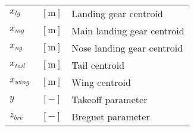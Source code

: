 \documentclass[12pt]{article}
\begin{document}
{\begin{supertabular}{lcl}
$x_{lg}$ & $~\mathrm{[m]}$ & Landing gear centroid\\
$x_{mg}$ & $~\mathrm{[m]}$ & Main landing gear centroid\\
$x_{ng}$ & $~\mathrm{[m]}$ & Nose landing gear centroid\\
$x_{tail}$ & $~\mathrm{[m]}$ & Tail centroid\\
$x_{wing}$ & $~\mathrm{[m]}$ & Wing centroid\\
$y$ & $~[-]$ & Takeoff parameter \\
$z_{bre}$ & $~[-]$ & Breguet parameter \\
\bottomrule
\end{supertabular}}
\end{document}
